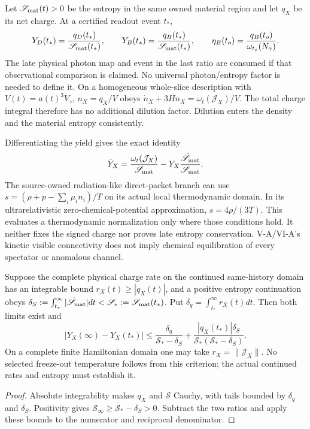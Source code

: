 \documentclass[12pt,a4paper]{article}
\begin{document}
Let $\mathscr S_{\rm mat}(t)>0$ be the entropy in the same owned material
region and let $q_X$ be its net charge. At a certified readout event $t_*$,
\begin{equation}
 Y_D(t_*)=\frac{q_D(t_*)}{\mathscr S_{\rm mat}(t_*)},\qquad
 Y_B(t_*)=\frac{q_B(t_*)}{\mathscr S_{\rm mat}(t_*)},\qquad
 \eta_B(t_o)=\frac{q_B(t_o)}{\omega_{t_o}(N_\gamma)}.
 \label{p9:v2171:eq:finalratios}
\end{equation}
The late physical photon map and event in the last ratio are consumed if
that observational comparison is claimed. No universal photon/entropy
factor is needed to define it. On a homogeneous whole-slice description
with $V(t)=a(t)^3V_\gamma$, $n_X=q_X/V$ obeys
$\dot n_X+3Hn_X=\omega_t(\mathcal J_X)/V$.
The total charge integral therefore has no additional dilution factor.
Dilution enters the density and the material entropy consistently.

Differentiating the yield gives the exact identity
\begin{equation}
 \dot Y_X=\frac{\omega_t(\mathcal J_X)}{\mathscr S_{\rm mat}}
             -Y_X\frac{\dot{\mathscr S}_{\rm mat}}{\mathscr S_{\rm mat}}.
 \label{p9:v2171:eq:yieldflow}
\end{equation}
The source-owned radiation-like direct-packet branch can use
$s=(\rho+p-\sum_i\mu_i n_i)/T$ on its actual local thermodynamic domain.
In its ultrarelativistic zero-chemical-potential approximation,
$s=4\rho/(3T)$. This evaluates a thermodynamic normalization only where
those conditions hold. It neither fixes the signed charge nor proves
late entropy conservation. V-A/VI-A's kinetic visible connectivity does
not imply chemical equilibration of every spectator or anomalous channel.

\begin{proposition}
\label{p9:v2171:prop:tailcertificate}
Suppose the complete physical charge rate on the continued same-history
domain has an integrable bound $r_X(t)\ge|\dot q_X(t)|$, and a positive
entropy continuation obeys
$\delta_S:=\int_{t_*}^{\infty}|\dot{\mathscr S}_{\rm mat}|dt
 <\mathscr S_*:=\mathscr S_{\rm mat}(t_*)$.
Put $\delta_q=\int_{t_*}^{\infty}r_X(t)dt$.
Then both limits exist and
\begin{equation}
 |Y_X(\infty)-Y_X(t_*)|
 \le \frac{\delta_q}{\mathscr S_*-\delta_S}
 +\frac{|q_X(t_*)|\delta_S}
        {\mathscr S_*(\mathscr S_*-\delta_S)}.
 \label{p9:v2171:eq:tailbound}
\end{equation}
On a complete finite Hamiltonian domain one may take
$r_X=\|\mathcal J_X\|$. No selected freeze-out temperature follows from
this criterion; the actual continued rates and entropy must establish it.
\end{proposition}
\begin{proof}
Absolute integrability makes $q_X$ and $\mathscr S$ Cauchy, with tails
bounded by $\delta_q$ and $\delta_S$. Positivity gives
$\mathscr S_\infty\ge\mathscr S_*-\delta_S>0$. Subtract the two ratios
and apply these bounds to the numerator and reciprocal denominator.
\end{proof}
\end{document}
